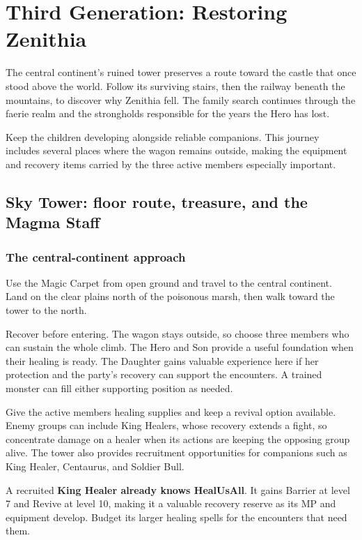 \chapter{Third Generation: Restoring Zenithia}
\label{written-zenithia}

The central continent's ruined tower preserves a route toward the
castle that once stood above the world. Follow its surviving stairs,
then the railway beneath the mountains, to discover why Zenithia
fell. The family search continues through the faerie realm and the
strongholds responsible for the years the Hero has lost.

Keep the children developing alongside reliable companions. This
journey includes several places where the wagon remains outside,
making the equipment and recovery items carried by the three active
members especially important.

\section{Sky Tower: floor route, treasure, and the Magma Staff}

\subsection*{The central-continent approach}

Use the Magic Carpet from open ground and travel to the central
continent. Land on the clear plains north of the poisonous marsh,
then walk toward the tower to the north.

Recover before entering. The wagon stays outside, so choose three
members who can sustain the whole climb. The Hero and Son provide
a useful foundation when their healing is ready. The Daughter gains
valuable experience here if her protection and the party's recovery
can support the encounters. A trained monster can fill either
supporting position as needed.

Give the active members healing supplies and keep a revival option
available. Enemy groups can include King Healers, whose recovery
extends a fight, so concentrate damage on a healer when its actions
are keeping the opposing group alive. The tower also provides
recruitment opportunities for companions such as King Healer,
Centaurus, and Soldier Bull.

A recruited \textbf{King Healer already knows HealUsAll}.
It gains Barrier at level 7 and Revive at level 10, making
it a valuable recovery reserve as its MP and equipment develop.
Budget its larger healing spells for the encounters that need them.

